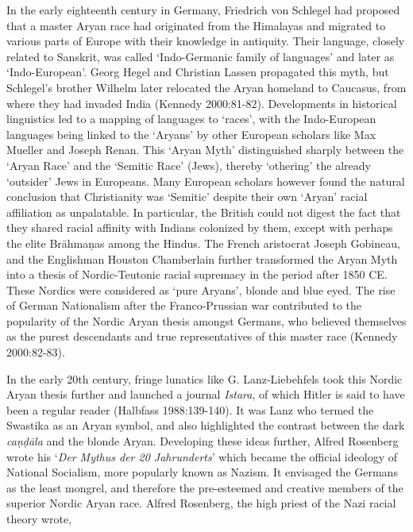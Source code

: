In the early eighteenth century in Germany, Friedrich von Schlegel had proposed that a master Aryan race had originated from the Himalayas and migrated to various parts of Europe with their knowledge in antiquity. Their language, closely related to Sanskrit, was called ‘Indo-Germanic family of languages’ and later as ‘Indo-European’. Georg Hegel and Christian Lassen propagated this myth, but Schlegel’s brother Wilhelm later relocated the Aryan homeland to Caucasus, from where they had invaded India (Kennedy 2000:81-82). Developments in historical linguistics led to a mapping of languages to ‘races’, with the Indo-European languages being linked to the ‘Aryans’ by other European scholars like Max Mueller and Joseph Renan. This ‘Aryan Myth’ distinguished sharply between the ‘Aryan Race’ and the ‘Semitic Race’ (Jews), thereby ‘othering’ the already ‘outsider’ Jews in Europeans. Many European scholars however found the natural conclusion that Christianity was ‘Semitic’ despite their own ‘Aryan’ racial affiliation as unpalatable. In particular, the British could not digest the fact that they shared racial affinity with Indians colonized by them, except with perhaps the elite Brāhmaṇas among the Hindus. The French aristocrat Joseph Gobineau, and the Englishman Houston Chamberlain further transformed the Aryan Myth into a thesis of Nordic-Teutonic racial supremacy in the period after 1850 CE. These Nordics were considered as ‘pure Aryans’, blonde and blue eyed. The rise of German Nationalism after the Franco-Prussian war contributed to the popularity of the Nordic Aryan thesis amongst Germans, who believed themselves as the purest descendants and true representatives of this master race (Kennedy 2000:82-83).

In the early 20th century, fringe lunatics like G. Lanz-Liebehfels took this Nordic Aryan thesis further and launched a journal \textit{Istara}, of which Hitler is said to have been a regular reader (Halbfass 1988:139-140). It was Lanz who termed the Swastika as an Aryan symbol, and also highlighted the contrast between the dark \textit{caṇḍāla} and the blonde Aryan. Developing these ideas further, Alfred Rosenberg wrote his ‘\textit{Der Mythus der 20 Jahrunderts}’ which became the official ideology of National Socialism, more popularly known as Nazism. It envisaged the Germans as the least mongrel, and therefore the pre-esteemed and creative members of the superior Nordic Aryan race. Alfred Rosenberg, the high priest of the Nazi racial theory wrote,

